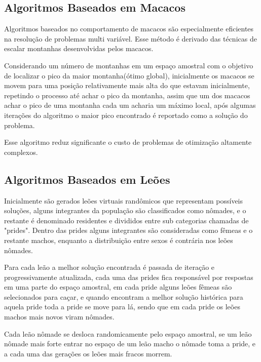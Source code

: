 \documentclass[letterpaper, 10 pt, conference]{ieeeconf}  %
\begin{document}
\subsection{Algoritmos Baseados em Macacos}

Algoritmos baseados no comportamento de macacos são especialmente eficientes na resolução de problemas multi variável. Esse método é derivado das técnicas de escalar montanhas desenvolvidas pelos macacos.

Considerando um número de montanhas em um espaço amostral com o objetivo de localizar o pico da maior montanha(ótimo global), inicialmente os macacos se movem para uma posição relativamente mais alta do que estavam inicialmente, repetindo o processo até achar o pico da montanha, assim que um dos macacos achar o pico de uma montanha cada um acharia um máximo local, após algumas iterações do algoritmo o maior pico encontrado é reportado como a solução do problema.

Esse algoritmo reduz significante o custo de problemas de otimização altamente complexos.


\subsection{Algoritmos Baseados em Leões}

Inicialmente são gerados leões virtuais randômicos que representam possíveis soluções, alguns integrantes da população são classificados como nômades, e o restante é denominado residentes e divididos entre sub categorias chamadas de "prides". Dentro das prides alguns integrantes são consideradas como fêmeas e o restante machos, enquanto a distribuição entre sexos é contrária nos leões nômades.

Para cada leão a melhor solução encontrada é passada de iteração e progressivamente atualizada, cada uma das prides fica responsável por respostas em uma parte do espaço amostral, em cada pride alguns leões fêmeas são selecionados para caçar, e quando encontram a melhor solução histórica para aquela pride toda a pride se move para lá, sendo que em cada pride os leões machos mais novos viram nômades.

Cada leão nômade se desloca randomicamente pelo espaço amostral, se um leão nômade mais forte entrar no espaço de um leão macho o nômade toma a pride, e a cada uma das gerações os leões mais fracos morrem.
\end{document}
